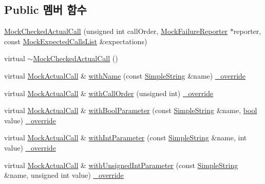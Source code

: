 \subsection*{Public 멤버 함수}
\begin{DoxyCompactItemize}
\item 
\hyperlink{class_mock_checked_actual_call_a4a19de5e0e1320400a8510bc4458fab7}{Mock\+Checked\+Actual\+Call} (unsigned int call\+Order, \hyperlink{class_mock_failure_reporter}{Mock\+Failure\+Reporter} $\ast$reporter, const \hyperlink{class_mock_expected_calls_list}{Mock\+Expected\+Calls\+List} \&expectations)
\item 
virtual \hyperlink{class_mock_checked_actual_call_a5aee6d09eaa403998338ec0aa87ceed6}{$\sim$\+Mock\+Checked\+Actual\+Call} ()
\item 
virtual \hyperlink{class_mock_actual_call}{Mock\+Actual\+Call} \& \hyperlink{class_mock_checked_actual_call_ae7c89b622276a3b97f7fa58deeaf110b}{with\+Name} (const \hyperlink{class_simple_string}{Simple\+String} \&name) \hyperlink{_cpp_u_test_config_8h_a049bea15dd750e15869863c94c1efc3b}{\+\_\+override}
\item 
virtual \hyperlink{class_mock_actual_call}{Mock\+Actual\+Call} \& \hyperlink{class_mock_checked_actual_call_aa025e9eb6893865e7f1df772334bf3fc}{with\+Call\+Order} (unsigned int) \hyperlink{_cpp_u_test_config_8h_a049bea15dd750e15869863c94c1efc3b}{\+\_\+override}
\item 
virtual \hyperlink{class_mock_actual_call}{Mock\+Actual\+Call} \& \hyperlink{class_mock_checked_actual_call_a1680f50f85a0607d6e348a0b9d54dccd}{with\+Bool\+Parameter} (const \hyperlink{class_simple_string}{Simple\+String} \&name, \hyperlink{avb__gptp_8h_af6a258d8f3ee5206d682d799316314b1}{bool} value) \hyperlink{_cpp_u_test_config_8h_a049bea15dd750e15869863c94c1efc3b}{\+\_\+override}
\item 
virtual \hyperlink{class_mock_actual_call}{Mock\+Actual\+Call} \& \hyperlink{class_mock_checked_actual_call_a0e256e5e14826fbba3dff8dffd0796ef}{with\+Int\+Parameter} (const \hyperlink{class_simple_string}{Simple\+String} \&name, int value) \hyperlink{_cpp_u_test_config_8h_a049bea15dd750e15869863c94c1efc3b}{\+\_\+override}
\item 
virtual \hyperlink{class_mock_actual_call}{Mock\+Actual\+Call} \& \hyperlink{class_mock_checked_actual_call_a2da305b889ee810e2f7bb4c709f4c29c}{with\+Unsigned\+Int\+Parameter} (const \hyperlink{class_simple_string}{Simple\+String} \&name, unsigned int value) \hyperlink{_cpp_u_test_config_8h_a049bea15dd750e15869863c94c1efc3b}{\+\_\+override}

\end{DoxyCompactItemize}
